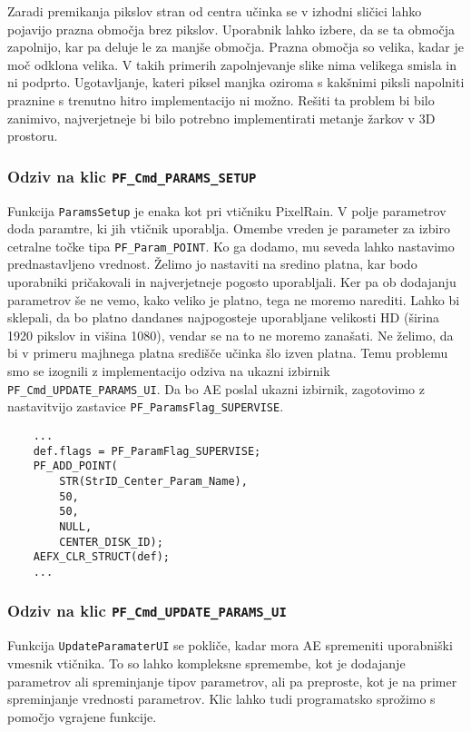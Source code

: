 \documentclass[a4paper, 12pt]{book}
\begin{document}
Zaradi premikanja pikslov stran od centra učinka se v izhodni sličici lahko pojavijo prazna območja brez pikslov.
Uporabnik lahko izbere, da se ta območja zapolnijo, kar pa deluje le za manjše območja. 
Prazna območja so velika, kadar je moč odklona velika. 
V takih primerih zapolnjevanje slike nima velikega smisla in ni podprto.
Ugotavljanje, kateri piksel manjka oziroma s kakšnimi piksli napolniti praznine s trenutno hitro implementacijo ni možno.
Rešiti ta problem bi bilo zanimivo, najverjetneje bi bilo potrebno implementirati metanje žarkov v 3D prostoru.

\subsubsection{Odziv na klic \texttt{PF\_Cmd\_PARAMS\_SETUP}}

Funkcija \verb!ParamsSetup! je enaka kot pri vtičniku PixelRain.
V polje parametrov doda paramtre, ki jih vtičnik uporablja.
Omembe vreden je parameter za izbiro cetralne točke tipa \verb!PF_Param_POINT!.
Ko ga dodamo, mu seveda lahko nastavimo prednastavljeno vrednost.
Želimo jo nastaviti na sredino platna, kar bodo uporabniki pričakovali in najverjetneje pogosto uporabljali.
Ker pa ob dodajanju parametrov še ne vemo, kako veliko je platno, tega ne moremo narediti.
Lahko bi sklepali, da bo platno dandanes najpogosteje uporabljane velikosti HD (širina 1920 pikslov in višina 1080), vendar se na to ne moremo zanašati.
Ne želimo, da bi v primeru majhnega platna središče učinka šlo izven platna.
Temu problemu smo se izognili z implementacijo odziva na ukazni izbirnik \verb!PF_Cmd_UPDATE_PARAMS_UI!.
Da bo AE poslal ukazni izbirnik, zagotovimo z nastavitvijo zastavice \verb!PF_ParamsFlag_SUPERVISE!.

\begin{verbatim}
    ...
    def.flags = PF_ParamFlag_SUPERVISE;
    PF_ADD_POINT(
        STR(StrID_Center_Param_Name),
        50,
        50,
        NULL,
        CENTER_DISK_ID);
    AEFX_CLR_STRUCT(def);
    ...
\end{verbatim}

\subsubsection{Odziv na klic \texttt{PF\_Cmd\_UPDATE\_PARAMS\_UI}}

Funkcija \verb!UpdateParamaterUI! se pokliče, kadar mora AE spremeniti uporabniški vmesnik vtičnika.
To so lahko kompleksne spremembe, kot je dodajanje parametrov ali spreminjanje tipov parametrov, ali pa preproste,
kot je na primer spreminjanje vrednosti parametrov.
Klic lahko tudi programatsko sprožimo s pomočjo vgrajene funkcije.
\end{document}
